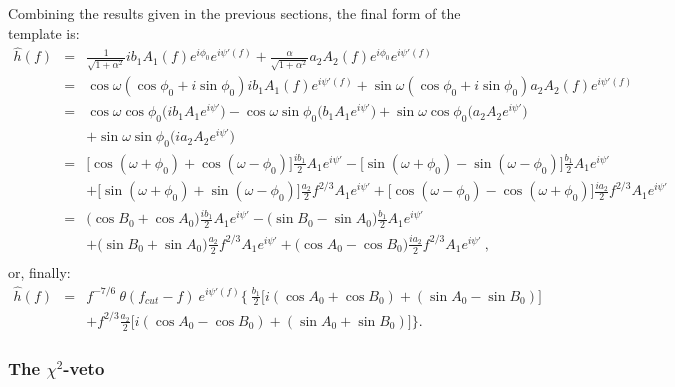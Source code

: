 Combining the results given in the previous sections, the final form of the 
template is:
\begin{eqnarray}
\hat{h}(f) &=& \frac{1}{\sqrt{1+\alpha^2}} i b_1 A_1(f) e^{i \phi_0}
e^{i \psi'(f)} + \frac{\alpha}{\sqrt{1+\alpha^2}} a_2 A_2(f)
e^{i \phi_0} e^{i \psi'(f)} \\
    &=& \cos\omega (\cos\phi_0 + i \sin\phi_0)
i b_1 A_1(f) e^{i \psi'(f)}  + \sin\omega (\cos\phi_0
+ i \sin\phi_0)  a_2 A_2(f) e^{i \psi'(f)}  \\
    &=& \cos\omega \cos\phi_0 \big ( i b_1 A_1 e^{i \psi'} \big ) -
\cos\omega \sin\phi_0 \big(b_1 A_1 e^{i \psi'}\big ) + \sin\omega \cos\phi_0
\big ( a_2 A_2 e^{i \psi'} \big ) \\
    && + \sin\omega \sin\phi_0 (i a_2 A_2
e^{i \psi'} \big )\\
    &=& \Big [ \cos(\omega+\phi_0) + \cos(\omega-\phi_0) \Big ]
\frac{i b_1}{2} A_1 e^{i \psi'} - \Big [ \sin(\omega +\phi_0) -
\sin(\omega-\phi_0) \Big ] \frac{b_1}{2} A_1 e^{i \psi'}\\
    && +\Big[ \sin(\omega+\phi_0)+\sin(\omega-\phi_0)\Big]
\frac{a_2}{2} f^{2/3} A_1 e^{i \psi'} 
    + \Big[ \cos(\omega-\phi_0) -
\cos(\omega+\phi_0) \Big] \frac{i a_2}{2} f^{2/3} A_1 e^{i \psi'} \\
    &=&\big ( \cos B_0 + \cos A_0 \big )
\frac{i b_1}{2} A_1 e^{i \psi'} - \big ( \sin B_0 -
\sin A_0 \big ) \frac{b_1}{2} A_1 e^{i \psi'}\\
        && +\big( \sin B_0+\sin A_0\big)
\frac{a_2}{2} f^{2/3} A_1 e^{i \psi'}
        + \big( \cos A_0 -
\cos B_0\big) \frac{i a_2}{2} f^{2/3} A_1 e^{i \psi'} \: , \\
\end{eqnarray}
or, finally:
\begin{eqnarray}
\hat{h}(f) &=& f^{-7/6} \: \theta(f_{cut}-f)\: e^{i \psi'(f)} \Big \{ \: 
\frac{b_1}{2} \big [ i (\cos A_0
+ \cos B_0) + (\sin A_0 - \sin B_0) \big ]  \\
&& +f^{2/3} \frac{a_2}{2} \big[ i (\cos A_0 - \cos B_0 ) +
(\sin A_0 + \sin B_0) \big ] \Big \}.
\end{eqnarray}

\subsubsection*{The $\chi^2$-veto}
\label{ChisquaredVeto}

